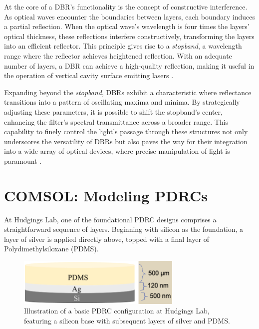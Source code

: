 At the core of a DBR's functionality is the concept of constructive interference. As optical waves encounter the boundaries between layers, each boundary induces a partial reflection. When the optical wave's wavelength is four times the layers' optical thickness, these reflections interfere constructively, transforming the layers into an efficient reflector. This principle gives rise to a \emph{stopband}, a wavelength range where the reflector achieves heightened reflection. With an adequate number of layers, a DBR can achieve a high-quality reflection, making it useful in the operation of vertical cavity surface emitting lasers \cite{multiphysics__distributed_nodate}.

Expanding beyond the \emph{stopband}, DBRs exhibit a characteristic where reflectance transitions into a pattern of oscillating maxima and minima. By strategically adjusting these parameters, it is possible to shift the stopband's center, enhancing the filter's spectral transmittance across a broader range. This capability to finely control the light's passage through these structures not only underscores the versatility of DBRs but also paves the way for their integration into a wide array of optical devices, where precise manipulation of light is paramount \cite{pedrotti_introduction_2007}.


\section{COMSOL: Modeling PDRCs}
At Hudgings Lab, one of the foundational PDRC designs comprises a straightforward sequence of layers. Beginning with silicon as the foundation, a layer of silver is applied directly above, topped with a final layer of Polydimethylsiloxane (PDMS).

\begin{figure}[H]
  \centering
  \includegraphics[width=0.7\textwidth]{Chapters/Figures/Chapter 4 Figures/PDRC Layout.png}
  \caption{Illustration of a basic PDRC configuration at Hudgings Lab, featuring a silicon base with subsequent layers of silver and PDMS.}
  \label{fig:PDRC-configuration-Hudgings-Lab}
\end{figure}

